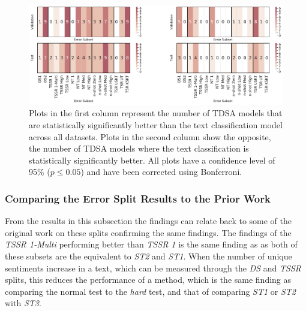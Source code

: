\begin{figure}[ht!]
    \centering
    \includegraphics[scale=0.48]{images/augmentation/methods_performance/baseline/baseline_combined_dataset_error_subset_heatmap.pdf}
    \caption{Plots in the first column represent the number of TDSA models that are statistically significantly better than the text classification model across all datasets. Plots in the second column show the opposite, the number of TDSA models where the text classification is statistically significantly better. All plots have a confidence level of 95\% ($p \leq 0.05$) and have been corrected using Bonferroni.}
    \label{fig:aug_baseline_combined_dataset_error_subset_heatmap}
\end{figure}


\afterpage{
    \begin{landscape}%
            \centering
            
    \end{landscape}
}

\newpage
\FloatBarrier
\subsubsection{Comparing the Error Split Results to the Prior Work}
\label{section:augmentation_cwr_comparing_to_prior_work_new}
From the results in this subsection the findings can relate back to some of the original work on these splits confirming the same findings. The findings of the \textit{TSSR 1-Multi} performing better than \textit{TSSR 1} is the same finding as \citet{nguyen-shirai-2015-phrasernn} as both of these subsets are the equivalent to \textit{ST2} and \textit{ST1}. When the number of unique sentiments increase in a text, which can be measured through the \textit{DS} and \textit{TSSR} splits, this reduces the performance of a method, which is the same finding as \citet{xue-li-2018-aspect} comparing the normal test to the \textit{hard} test, and that of \citet{nguyen-shirai-2015-phrasernn} comparing \textit{ST1} or \textit{ST2} with \textit{ST3}.  

